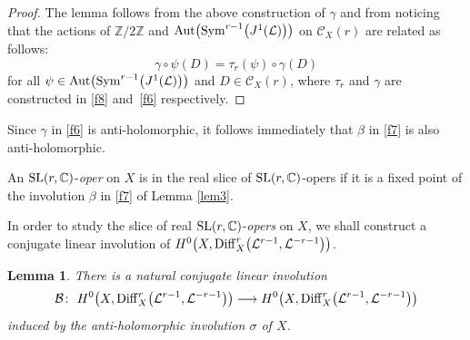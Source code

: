 \documentclass[pdftex]{sigma}
\numberwithin{equation}{section}
\newtheorem{Lemma}[Theorem]{Lemma}
\begin{document}
\begin{proof}
The lemma follows from the above construction of $\gamma$ and from noticing that the
actions of ${\mathbb Z}/2{\mathbb Z}$ and ${\rm Aut}\bigl({\rm Sym}^{r-1}\bigl(J^1(\mathcal L)\bigr)\bigr)$
on ${\mathcal C}_X(r)$ are related as follows:
\[
\gamma\circ\psi (D) = \tau_r(\psi)\circ\gamma(D)
\]
for all $\psi \in {\rm Aut}\bigl({\rm Sym}^{r-1}\bigl(J^1(\mathcal L)\bigr)\bigr)$ and $D \in {\mathcal C}_X(r)$, where $\tau_r$
and $\gamma$ are constructed in \eqref{f8} and~\eqref{f6} respectively.
\end{proof}

\begin{Remark} Since $\gamma$ in \eqref{f6} is anti-holomorphic, it
follows immediately that $\beta$ in \eqref{f7} is also anti-holomorphic.
\end{Remark}

\begin{Definition}\label{de1}
An ${\rm SL}(r,{\mathbb C})$-{\it oper} on $X$ is in the real slice of ${\rm SL}(r,\mathbb{C})$-opers if it is a fixed point of the
involution $\beta$ in \eqref{f7} of Lemma \ref{lem3}.
\end{Definition}

In order to study the slice of real ${\rm SL}(r,{\mathbb C})$-{\it opers} on $X$, we shall construct a conjugate linear involution of $H^0\bigl(X, {\rm Diff}^r_X\bigl({\mathcal L}^{r-1},
{\mathcal L}^{-r-1}\bigr)\bigr)$.

\begin{Lemma}\label{bigb} There is a natural
conjugate linear involution \begin{equation}\label{f9}
{\mathcal B} \colon\ H^0\bigl(X, {\rm Diff}^r_X\bigl({\mathcal L}^{r-1}, {\mathcal L}^{-r-1}\bigr)\bigr) \longrightarrow
H^0\bigl(X, {\rm Diff}^r_X\bigl({\mathcal L}^{r-1}, {\mathcal L}^{-r-1}\bigr)\bigr)
\end{equation}
induced by the anti-holomorphic involution $\sigma$ of $X$.
\end{Lemma}
\end{document}
